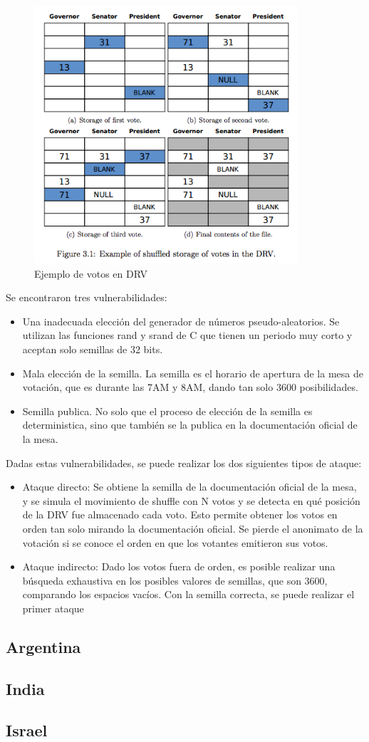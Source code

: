 \begin{figure}[h!]
\includegraphics{Imagenes/privacidad1}
\caption{Ejemplo de votos en DRV}
\end{figure}

Se encontraron tres vulnerabilidades:
\begin{itemize}
	\item Una inadecuada elección del generador de números pseudo-aleatorios. Se utilizan las funciones rand y srand de C que tienen un periodo muy corto y aceptan solo semillas de 32 bits.
	\item Mala elección de la semilla. La semilla es el horario de apertura de la mesa de votación, que es durante las 7AM y 8AM, dando tan solo 3600 posibilidades.
	\item Semilla publica. No solo que el proceso de elección de la semilla es deterministica, sino que también se la publica en la documentación oficial de la mesa.
\end{itemize}

Dadas estas vulnerabilidades, se puede realizar los dos siguientes tipos de ataque:
\begin{itemize}
	\item Ataque directo: Se obtiene la semilla de la documentación oficial de la mesa, y se simula el movimiento de shuffle con N votos y se detecta en qué posición de la DRV fue almacenado cada voto. Esto permite obtener los votos en orden tan solo mirando la documentación oficial. Se pierde el anonimato de la votación si se conoce el orden en que los votantes emitieron sus votos.
	\item Ataque indirecto: Dado los votos fuera de orden, es posible realizar una búsqueda exhaustiva en los posibles valores de semillas, que son 3600, comparando los espacios vacíos.  Con la semilla correcta, se puede realizar el primer ataque
\end{itemize}

\subsection{Argentina}

\subsection{India}

\subsection{Israel}